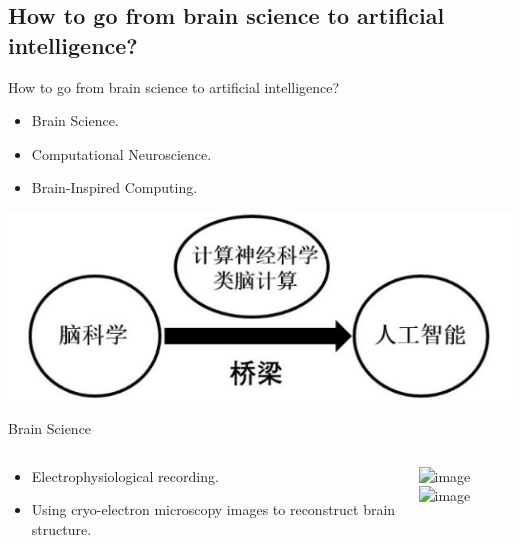 \documentclass{beamer}
\begin{document}
\subsection{How to go from brain science to artificial intelligence?}
\begin{frame}{How to go from brain science to artificial intelligence?}
  \begin{itemize}
    \item Brain Science.
    \item Computational Neuroscience.
    \item Brain-Inspired Computing.
  \end{itemize}
  \begin{center}
    \includegraphics[width=0.6\linewidth]{figs/brain2ai.png}
  \end{center}
\end{frame}

\begin{frame}{Brain Science}
  \begin{columns}
    \begin{column}{.5\linewidth}
      \begin{itemize}
        \item<1-|alert@1> Electrophysiological recording.
        \item<2-|alert@2> Using cryo-electron microscopy images to reconstruct brain structure.
      \end{itemize}
    \end{column}

    \begin{column}{.5\linewidth}
      \includegraphics<1>[width=0.6\linewidth]{figs/electrophysiological-recording.png}
      \includegraphics<2>[width=0.8\linewidth]{figs/brain-reconstruct.png}
    \end{column}
  \end{columns}
\end{frame}
\end{document}
